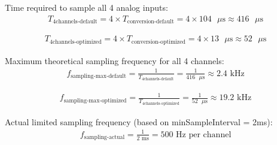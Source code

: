 Time required to sample all 4 analog inputs:
\begin{equation} \label{T4analogIn}
  \begin{split}
T_\text{4channels-default} = 4 \times T_\text{conversion-default} = 4 \times 104 \text{ $\mu$s} \approx 416 \text{ $\mu$s}
\end{split}
\end{equation}

\begin{equation} \label{T4analogIn2}
  \begin{split}
T_\text{4channels-optimized} = 4 \times T_\text{conversion-optimized} = 4 \times 13 \text{ $\mu$s} \approx 52 \text{ $\mu$s}
\end{split}
\end{equation}

Maximum theoretical sampling frequency for all 4 channels:
\begin{equation} \label{Tmax4ch}
  \begin{split}
f_\text{sampling-max-default} = \frac{1}{T_\text{4channels-default}} = \frac{1}{416 \text{ $\mu$s}} \approx 2.4 \text{ kHz}
\end{split}
\end{equation}

\begin{equation} \label{Tmax4ch2}
  \begin{split}
f_\text{sampling-max-optimized} = \frac{1}{T_\text{4channels-optimized}} = \frac{1}{52 \text{ $\mu$s}} \approx 19.2 \text{ kHz}
\end{split}
\end{equation}

Actual limited sampling frequency (based on minSampleInterval = 2ms):
\begin{equation} \label{Tlim2ms}
  \begin{split}
f_\text{sampling-actual} = \frac{1}{2 \text{ ms}} = 500 \text{ Hz} \text{ per channel}
\end{split}
\end{equation}

